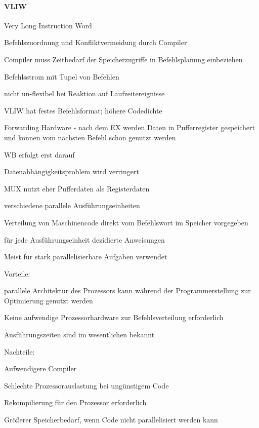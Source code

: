 \documentclass[10pt,landscape]{article}
\begin{document}
\begin{multicols}{3}
  \paragraph{VLIW} Very Long Instruction Word
  \begin{itemize*}
    \item Befehlszuordnung und Konfliktvermeidung durch Compiler
    \item Compiler muss Zeitbedarf der Speicherzugriffe in Befehlsplanung einbeziehen
    \item Befehlsstrom mit Tupel von Befehlen
    \item nicht un-flexibel bei Reaktion auf Laufzeitereignisse
    \item VLIW hat festes Befehlsformat; höhere Codedichte
    \item Forwarding Hardware - nach dem EX werden Daten in Pufferregister gespeichert und können vom nächsten Befehl schon genutzt werden
    \item WB erfolgt erst darauf
    \item Datenabhängigkeitsproblem wird verringert
    \item MUX nutzt eher Pufferdaten als Registerdaten
    \item verschiedene parallele Ausführungseinheiten
    \item Verteilung von Maschinencode direkt vom Befehlswort im Speicher vorgegeben
    \item für jede Ausführungseinheit dezidierte Anweisungen
    \item Meist für stark parallelisierbare Aufgaben verwendet
    \item Vorteile:
    \begin{itemize*}
      \item parallele Architektur des Prozessors kann während der Programmerstellung zur Optimierung genutzt werden
      \item Keine aufwendige Prozessorhardware zur Befehlsverteilung erforderlich
      \item Ausführungszeiten sind im wesentlichen bekannt
    \end{itemize*}
    \item Nachteile:
    \begin{itemize*}
      \item Aufwendigere Compiler
      \item Schlechte Prozessorauslastung bei ungünstigem Code
      \item Rekompilierung für den Prozessor erforderlich
      \item Größerer Speicherbedarf, wenn Code nicht parallelisiert werden kann
    \end{itemize*}
  \end{itemize*}  
  

\end{multicols}
\end{document}
